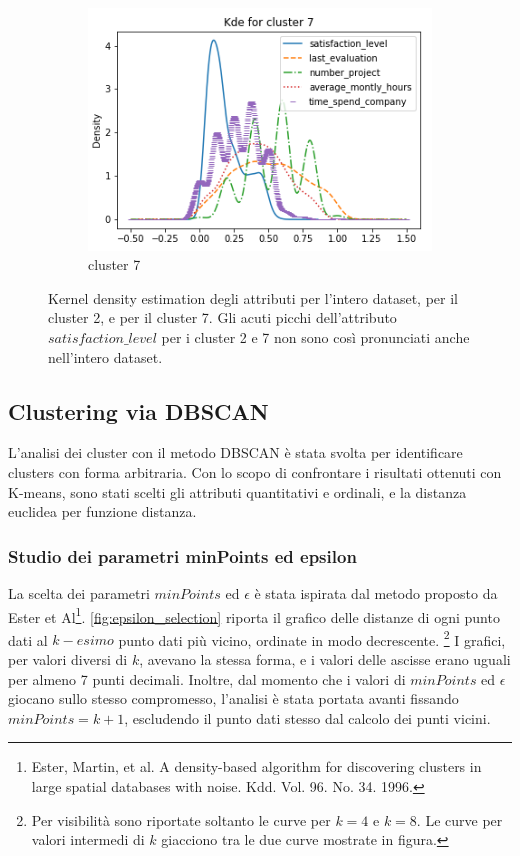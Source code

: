 \documentclass[a4paper]{article}
\begin{document}
\begin{figure}
\begin{subfigure}[b]{.33\textwidth}
  \includegraphics[width=1\textwidth]{../images/kde_within_clusters_c7.png}
  \caption{cluster 7}
  \label{fig:kde_7}
\end{subfigure}
\caption{Kernel density estimation degli attributi 
    		 per l'intero dataset, 
    		 per il cluster 2, e
    		 per il cluster 7. Gli acuti picchi dell'attributo $satisfaction\_level$ per i cluster 2 e 7 non sono così pronunciati anche nell'intero dataset.}%
    \label{fig:kde_clusters}%
\label{fig:test}
\end{figure}

\subsection{Clustering via DBSCAN}
L'analisi dei cluster con il metodo DBSCAN è stata svolta per identificare clusters con forma arbitraria.
Con lo scopo di confrontare i risultati ottenuti con K-means, sono stati scelti gli attributi quantitativi e ordinali, e la distanza euclidea per funzione distanza.

\subsubsection{Studio dei parametri minPoints ed epsilon}
La scelta dei parametri $minPoints$ ed $\epsilon$ è stata ispirata dal metodo proposto da Ester et Al\footnote{Ester, Martin, et al. A density-based algorithm for discovering clusters in large spatial databases with noise. Kdd. Vol. 96. No. 34. 1996.}. 
\autoref{fig:epsilon_selection} riporta il grafico delle distanze di ogni punto dati al $k-esimo$ punto dati più vicino, ordinate in modo decrescente. 
\footnote{Per visibilità sono riportate soltanto le curve  per $k=4$ e $k=8$. Le curve per valori intermedi di $k$ giacciono tra le due curve mostrate in figura.}
I grafici, per valori diversi di $k$, avevano la stessa forma, e i valori delle ascisse erano uguali per almeno 7 punti decimali. Inoltre, dal momento che i valori di $minPoints$ ed $\epsilon$ giocano sullo stesso compromesso, l'analisi è stata portata avanti fissando $minPoints=k+1$, escludendo il punto dati stesso dal calcolo dei punti vicini.
\end{document}
